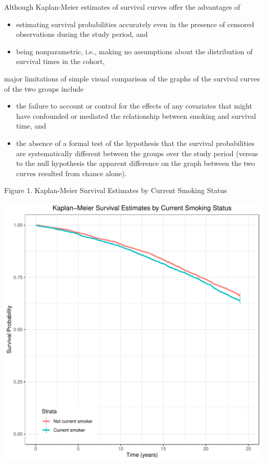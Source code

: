 \documentclass{article}\usepackage[]{graphicx}\usepackage[]{color}
\makeatletter
\def\maxwidth{ %
  \ifdim\Gin@nat@width>\linewidth
    \linewidth
  \else
    \Gin@nat@width
  \fi
}
\newenvironment{knitrout}{}{} %
\makeatother
\begin{document}
\vspace{2mm}

Although Kaplan-Meier estimates of survival curves offer the advantages of 
\begin{itemize}
  \item estimating survival probabilities accurately even in the presence of censored observations during the study period, and
  \item being nonparametric, i.e., making no assumptions about the distribution of survival times in the cohort,
\end{itemize}

major limitations of simple visual comparison of the graphs of the survival curves of the two groups include 

\begin{itemize}
  \item the failure to account or control for the effects of any covariates that might have confounded or mediated the relationship between smoking and survival time, and
  \item the absence of a formal test of the hypothesis that the survival probabilities are systematically different between the groups over the study period (versus to the null hypothesis the apparent difference on the graph between the two curves resulted from chance alone).
  
\end{itemize}

\pagebreak

Figure 1. Kaplan-Meier Survival Estimates by Current Smoking Status







\begin{knitrout}
\color{fgcolor}
\includegraphics[width=\maxwidth]{figure/unnamed-chunk-15-1} 

\end{knitrout}
\end{document}
